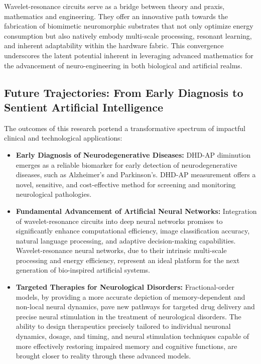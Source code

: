 \documentclass{article}
\begin{document}
Wavelet-resonance circuits serve as a bridge between theory and praxis, mathematics and engineering. They offer an innovative path towards the fabrication of biomimetic neuromorphic substrates that not only optimize energy consumption but also natively embody multi-scale processing, resonant learning, and inherent adaptability within the hardware fabric. This convergence underscores the latent potential inherent in leveraging advanced mathematics for the advancement of neuro-engineering in both biological and artificial realms.

\subsection{Future Trajectories: From Early Diagnosis to Sentient Artificial Intelligence}

The outcomes of this research portend a transformative spectrum of impactful clinical and technological applications:
\begin{itemize}
    \item \textbf{Early Diagnosis of Neurodegenerative Diseases:} DHD-AP diminution emerges as a reliable biomarker for early detection of neurodegenerative diseases, such as Alzheimer’s and Parkinson’s. DHD-AP measurement offers a novel, sensitive, and cost-effective method for screening and monitoring neurological pathologies.
    \item \textbf{Fundamental Advancement of Artificial Neural Networks:} Integration of wavelet-resonance circuits into deep neural networks promises to significantly enhance computational efficiency, image classification accuracy, natural language processing, and adaptive decision-making capabilities. Wavelet-resonance neural networks, due to their intrinsic multi-scale processing and energy efficiency, represent an ideal platform for the next generation of bio-inspired artificial systems.
    \item \textbf{Targeted Therapies for Neurological Disorders:} Fractional-order models, by providing a more accurate depiction of memory-dependent and non-local neural dynamics, pave new pathways for targeted drug delivery and precise neural stimulation in the treatment of neurological disorders. The ability to design therapeutics precisely tailored to individual neuronal dynamics, dosage, and timing, and neural stimulation techniques capable of more effectively restoring impaired memory and cognitive functions, are brought closer to reality through these advanced models.
\end{itemize}
\end{document}
